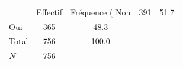 {
\def\sym#1{\ifmmode^{#1}\else\(^{#1}\)\fi}
\begin{tabular}{l*{1}{cc}}
\toprule
            &    Effectif&Fréquence (%
\midrule
Non         &         391&        51.7\\
Oui         &         365&        48.3\\
Total       &         756&       100.0\\
\midrule
\(N\)       &         756&            \\
\bottomrule
\end{tabular}
}
